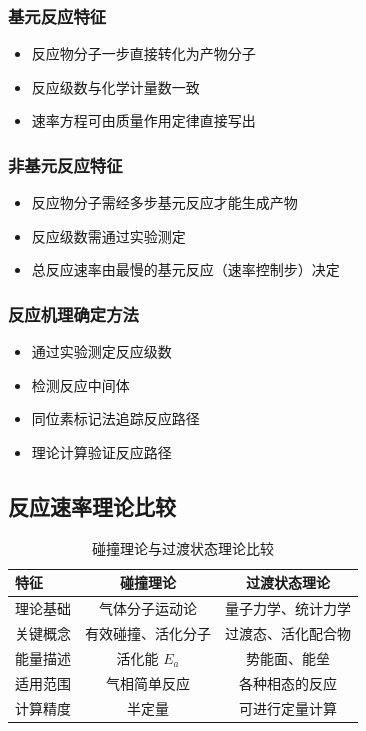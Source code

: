 \subsubsection{基元反应特征}
\begin{itemize}
\item 反应物分子一步直接转化为产物分子
\item 反应级数与化学计量数一致
\item 速率方程可由质量作用定律直接写出
\end{itemize}

\subsubsection{非基元反应特征}
\begin{itemize}
\item 反应物分子需经多步基元反应才能生成产物
\item 反应级数需通过实验测定
\item 总反应速率由最慢的基元反应（速率控制步）决定
\end{itemize}

\subsubsection{反应机理确定方法}
\begin{itemize}
\item 通过实验测定反应级数
\item 检测反应中间体
\item 同位素标记法追踪反应路径
\item 理论计算验证反应路径
\end{itemize}

\subsection{反应速率理论比较}
\begin{table}[ht]
\centering
\caption*{碰撞理论与过渡状态理论比较}
\begin{tabular}{lcc}
\toprule
特征 & 碰撞理论 & 过渡状态理论 \\
\midrule
理论基础 & 气体分子运动论 & 量子力学、统计力学 \\
关键概念 & 有效碰撞、活化分子 & 过渡态、活化配合物 \\
能量描述 & 活化能 $E_a$ & 势能面、能垒 \\
适用范围 & 气相简单反应 & 各种相态的反应 \\
计算精度 & 半定量 & 可进行定量计算 \\
\bottomrule
\end{tabular}
\end{table}

